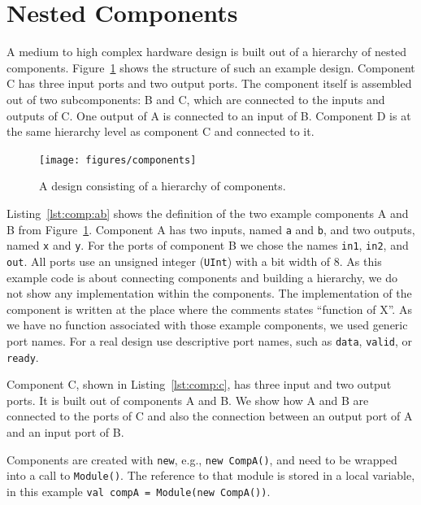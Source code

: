 \documentclass[%
    10pt,
    headinclude, footexclude,
    openright, %
    notitlepage,
    cleardoubleempty,
    headsepline,
    pointlessnumbers,
    bibtotoc, idxtotoc,
    ]{scrbook}
\newcommand{\code}[1]{{\small{\texttt{#1}}}}
\begin{document}
\section{Nested Components}

A medium to high complex hardware design is built out of a hierarchy of
nested components.
Figure~\ref{fig:components} shows the structure of such an example design. Component C has
three input ports and two output ports. The component itself is assembled out
of two subcomponents: B and C, which are connected to the inputs and
outputs of C. One output of A is connected to an input of B.
Component D is at the same hierarchy level as component C and connected
to it.

\begin{figure}
  \centering
  \texttt{[image: figures/components]}
  \caption{A design consisting of a hierarchy of components.}
  \label{fig:components}
\end{figure}


Listing~\ref{lst:comp:ab} shows the definition of the two example components A and B from
Figure~\ref{fig:components}.
Component A has two inputs, named \code{a} and \code{b}, and two
outputs, named \code{x} and \code{y}. For the ports of component B
we chose the names \code{in1}, \code{in2}, and \code{out}.
All ports use an unsigned integer (\code{UInt}) with a bit width of 8.
As this example code is about connecting components and building a
hierarchy, we do not show any implementation within the components.
The implementation of the component is written at the place where
the comments states ``function of X''.
As we have no function associated with those example components,
we used generic port names. For a real design use descriptive
port names, such as \code{data}, \code{valid}, or \code{ready}.

Component C, shown in Listing~\ref{lst:comp:c}, has three input and two output ports. It is built out of
components A and B. We show how A and B are connected to the ports
of C and also the connection between an output port of A and an
input port of B.


Components are created with \code{new}, e.g., \code{new CompA()}, and need to be wrapped
into a call to \code{Module()}. The reference to that module is stored in a local variable,
in this example \code{val compA = Module(new CompA())}.
\end{document}
